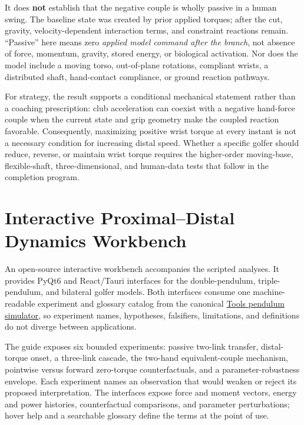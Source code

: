 \documentclass[
  letterpaper,
]{report}
\begin{document}
It does \textbf{not} establish that the negative couple is wholly
passive in a human swing. The baseline state was created by prior
applied torques; after the cut, gravity, velocity-dependent interaction
terms, and constraint reactions remain. ``Passive'' here means zero
\emph{applied model command after the branch}, not absence of force,
momentum, gravity, stored energy, or biological activation. Nor does the
model include a moving torso, out-of-plane rotations, compliant wrists,
a distributed shaft, hand-contact compliance, or ground reaction
pathways.

For strategy, the result supports a conditional mechanical statement
rather than a coaching prescription: club acceleration can coexist with
a negative hand-force couple when the current state and grip geometry
make the coupled reaction favorable. Consequently, maximizing positive
wrist torque at every instant is not a necessary condition for
increasing distal speed. Whether a specific golfer should reduce,
reverse, or maintain wrist torque requires the higher-order moving-base,
flexible-shaft, three-dimensional, and human-data tests that follow in
the completion program.

\chapter{Interactive Proximal--Distal Dynamics
Workbench}\label{sec-interactive-workbench}

An open-source interactive workbench accompanies the scripted analyses.
It provides PyQt6 and React/Tauri interfaces for the double-pendulum,
triple-pendulum, and bilateral golfer models. Both interfaces consume
one machine-readable experiment and glossary catalog from the canonical
\href{https://github.com/D-sorganization/Tools/tree/main/src/pendulum_simulator}{Tools
pendulum simulator}, so experiment names, hypotheses, falsifiers,
limitations, and definitions do not diverge between applications.

The guide exposes six bounded experiments: passive two-link transfer,
distal-torque onset, a three-link cascade, the two-hand
equivalent-couple mechanism, pointwise versus forward zero-torque
counterfactuals, and a parameter-robustness envelope. Each experiment
names an observation that would weaken or reject its proposed
interpretation. The interfaces expose force and moment vectors, energy
and power histories, counterfactual comparisons, and parameter
perturbations; hover help and a searchable glossary define the terms at
the point of use.
\end{document}

